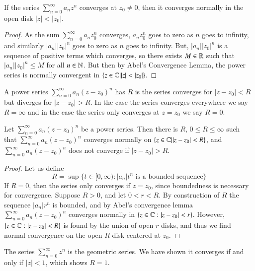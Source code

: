 \documentclass[12pt, a4paper, oneside, openright, titlepage]{book}
\begin{document}
\begin{cor}
    If the series $\sum_{n=0}^{\infty}a_nz^n$ converges at $z_0 \neq 0$, then it converges normally in the open disk $|z| < |z_0|$.
\end{cor}
\begin{proof}
    As the sum $\sum_{n=0}^{\infty}a_nz_0^n$ converges, $a_nz_0^n$ goes to zero as $n$ goes to infinity, and similarly $|a_n||z_0|^n$ goes to zero as $n$ goes to infinity. But, $|a_n||z_0|^n$ is a sequence of positive terms which converges, so there exists $M \in \mathbb R$ such that $|a_n||z_0|^n \leq M$ for all $n \in \mathbb N$. But then by Abel's Convergence Lemma, the power series is normally convergent in $\{z \in \mathbb C\vert |z| < |z_0|\}$.
\end{proof}

\begin{defn}
    A power series $\sum_{n=0}^{\infty}a_n(z-z_0)^n$ has  $R$ is the series converges for $|z-z_0| < R$ but diverges for $|z-z_0| > R$. In the case the series converges everywhere we say $R = \infty$ and in the case the series only converges at $z = z_0$ we say $R = 0$.
\end{defn}

\begin{thm}
    Let $\sum_{n=0}^{\infty}a_n(z-z_0)^n$ be a power series. Then there is $R$, $0 \leq R \leq \infty$ such that $\sum_{n=0}^{\infty}a_n(z-z_0)^n$ converges normally on $\{z \in \mathbb C\vert |z-z_0| < R\}$, and $\sum_{n=0}^{\infty}a_n(z-z_0)^n$ does not converge if $|z-z_0| > R$.
\end{thm}
\begin{proof}
    Let us define \begin{equation*}
        R = \sup\{t \in [0,\infty):|a_n|t^n\text{ is a bounded sequence}\}
    \end{equation*}
    If $R = 0$, then the series only converges if $z = z_0$, since boundedness is necessary for convergence. Suppose $R > 0$, and let $0 < r < R$. By construction of $R$ the sequence $|a_n|r^n$ is bounded, and by Abel's convergence lemma $\sum_{n=0}^{\infty}a_n(z-z_0)^n$ converges normally in $\{z \in \mathbb C:|z-z_0| < r\}$. However, $\{z\in \mathbb C:|z-z_0| < R\}$ is found by the union of open $r$ disks, and thus we find normal convergence on the open $R$ disk centered at $z_0$. 
\end{proof}


\begin{eg}
    The series $\sum_{n=0}^{\infty}z^n$ is the geometric series. We have shown it converges if and only if $|z| < 1$, which shows $R = 1$.
\end{eg}
\end{document}
